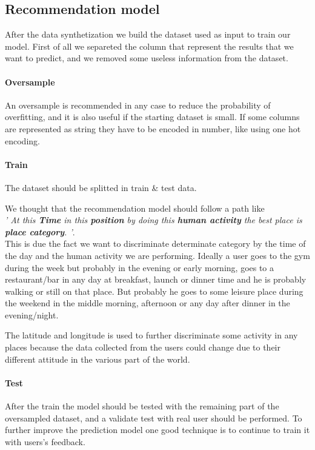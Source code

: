 \documentclass[../../main]{subfiles}
\begin{document}
\subsection{Recommendation model}
After the data synthetization we build the dataset used as input to train our model. 
First of all we separeted the column that represent the results that we want to predict, and we removed some useless information from the dataset.
\paragraph*{Oversample}
An oversample is recommended in any case to reduce the probability of overfitting, and it is also useful if the starting dataset is small.
If some columns are represented as string they have to be encoded in number, like using one hot encoding.
\paragraph*{Train}
The dataset should be splitted in train \& test data.

We thought that the recommendation model should follow a path like \\\textit{' At this \textbf{Time} in this \textbf{position} by doing this \textbf{human activity} the best place is \textbf{place category}. '}.
\\This is due the fact we want to discriminate determinate category by the time of the day and the human activity we are performing.
Ideally a user goes to the gym during the week but probably in the evening or early morning, 
goes to a restaurant/bar in any day at breakfast, launch or dinner time and he is probably walking or still on that place.
But probably he goes to some leisure place during the weekend in the middle morning, afternoon or any day after dinner in the evening/night.

The latitude and longitude is used to further discriminate some activity in any places because the data collected from the users could change due to their different attitude in the various part of the world.
\paragraph*{Test}
After the train the model should be tested with the remaining part of the oversampled dataset, and a validate test with real user should be performed.
To further improve the prediction model one good technique is to continue to train it with users's feedback.
\end{document}
